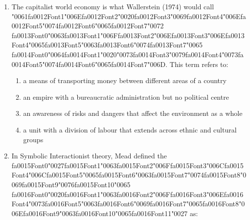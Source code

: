 \documentclass[12pt]{article}
\begin{document}
\begin{enumerate}[label=\arabic*.]
\begin{enumerate}[label=(\alph*)]
    \item absolute poverty
    \item relative poverty
    \item vertical mobility
    \item horizontal mobility
\end{enumerate}
\item The capitalist world economy is what Wallerstein (1974) would call {\char"0061}{\csname fa0012Font1\endcsname\char"006E}{\csname fa0012Font2\endcsname\char"0020}{\csname fa0012Font3\endcsname\char"0069}{\csname fa0012Font4\endcsname\char"006E}{\csname fa0012Font5\endcsname\char"0074}{\csname fa0012Font6\endcsname\char"0065}{\csname fa0012Font7\endcsname\char"0072} {\csname fa0013Font0\endcsname\char"0063}{\csname fa0013Font1\endcsname\char"006F}{\csname fa0013Font2\endcsname\char"006E}{\csname fa0013Font3\endcsname\char"006E}{\csname fa0013Font4\endcsname\char"0065}{\csname fa0013Font5\endcsname\char"0063}{\csname fa0013Font6\endcsname\char"0074}{\csname fa0013Font7\endcsname\char"0065} {\csname fa0014Font0\endcsname\char"0064}{\csname fa0014Font1\endcsname\char"0020}{\char"0073}{\csname fa0014Font3\endcsname\char"0079}{\csname fa0014Font4\endcsname\char"0073}{\csname fa0014Font5\endcsname\char"0074}{\csname fa0014Font6\endcsname\char"0065}{\csname fa0014Font7\endcsname\char"006D}. This term refers to:
\begin{enumerate}[label=(\alph*)]
    \item a means of transporting money between different areas of a country
    \item an empire with a bureaucratic administration but no political centre
    \item an awareness of risks and dangers that affect the environment as a whole
    \item a unit with a division of labour that extends across ethnic and cultural groups
\end{enumerate}
\item In Symbolic Interactionist theory, Mead defined the {\csname fa0015Font0\endcsname\char"0027}{\csname fa0015Font1\endcsname\char"0063}{\csname fa0015Font2\endcsname\char"006F}{\csname fa0015Font3\endcsname\char"006C}{\csname fa0015Font4\endcsname\char"006C}{\csname fa0015Font5\endcsname\char"0065}{\csname fa0015Font6\endcsname\char"0063}{\csname fa0015Font7\endcsname\char"0074}{\csname fa0015Font8\endcsname\char"0069}{\csname fa0015Font9\endcsname\char"0076}{\csname fa0015Font10\endcsname\char"0065} {\csname fa0016Font0\endcsname\char"0020}{\csname fa0016Font1\endcsname\char"0063}{\csname fa0016Font2\endcsname\char"006F}{\csname fa0016Font3\endcsname\char"006E}{\csname fa0016Font4\endcsname\char"0073}{\csname fa0016Font5\endcsname\char"0063}{\csname fa0016Font6\endcsname\char"0069}{\csname fa0016Font7\endcsname\char"0065}{\csname fa0016Font8\endcsname\char"006E}{\csname fa0016Font9\endcsname\char"0063}{\csname fa0016Font10\endcsname\char"0065}{\csname fa0016Font11\endcsname\char"0027} as:

\end{enumerate}
\end{document}
